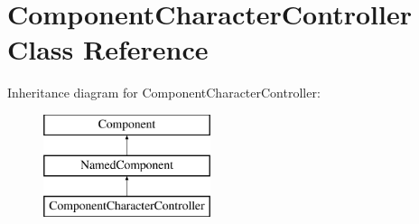 \hypertarget{classComponentCharacterController}{
\section{\-Component\-Character\-Controller \-Class \-Reference}
\label{dd/d8a/classComponentCharacterController}
}
\-Inheritance diagram for \-Component\-Character\-Controller\-:\begin{figure}[H]
\begin{center}
\leavevmode
\includegraphics[height=3.000000cm]{dd/d8a/classComponentCharacterController}
\end{center}
\end{figure}
